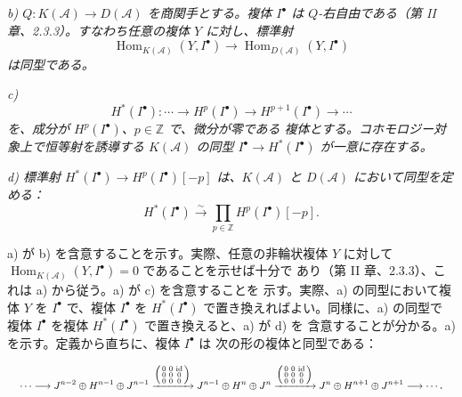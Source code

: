 \clearpage
{}%
\begingroup\small\setlength{\parskip}{0pt}\setlength{\emergencystretch}{1.5em}
\setlength{\abovedisplayskip}{4pt plus 2pt minus 2pt}%
\setlength{\belowdisplayskip}{4pt plus 2pt minus 2pt}%

\noindent\textit{b)
$Q\colon K(\mathcal A)\longrightarrow D(\mathcal A)$ を商関手とする。複体
$I^\bullet$ は $Q$-右自由である（第 II 章、2.3.3）。すなわち任意の複体
$Y$ に対し、標準射}
\[
\operatorname{Hom}_{K(\mathcal A)}(Y,I^\bullet)
\longrightarrow\operatorname{Hom}_{D(\mathcal A)}(Y,I^\bullet)
\]
\textit{は同型である。}

\noindent\textit{c)}
\[
H^*(I^\bullet)\colon\cdots\longrightarrow H^p(I^\bullet)
\longrightarrow H^{p+1}(I^\bullet)\longrightarrow\cdots
\]
\textit{を、成分が $H^p(I^\bullet)$、$p\in\mathbb Z$ で、微分が零である
複体とする。コホモロジー対象上で恒等射を誘導する $K(\mathcal A)$ の同型
$I^\bullet\longrightarrow H^*(I^\bullet)$ が一意に存在する。}

\noindent\textit{d) 標準射
$H^*(I^\bullet)\longrightarrow H^p(I^\bullet)[-p]$ は、$K(\mathcal A)$ と
$D(\mathcal A)$ において同型を定める：}
\[
H^*(I^\bullet)\xrightarrow{\sim}
\prod_{p\in\mathbb Z}H^p(I^\bullet)[-p].
\]

a) が b) を含意することを示す。実際、任意の非輪状複体 $Y$ に対して
$\operatorname{Hom}_{K(\mathcal A)}(Y,I^\bullet)=0$ であることを示せば十分で
あり（第 II 章、2.3.3）、これは a) から従う。a) が c) を含意することを
示す。実際、a) の同型において複体 $Y$ を $I^\bullet$ で、複体
$I^\bullet$ を $H^*(I^\bullet)$ で置き換えればよい。同様に、a) の同型で
複体 $I^\bullet$ を複体 $H^*(I^\bullet)$ で置き換えると、a) が d) を
含意することが分かる。a) を示す。定義から直ちに、複体 $I^\bullet$ は
次の形の複体と同型である：

\[
\resizebox{0.98\linewidth}{!}{$
\displaystyle
\cdots\longrightarrow
J^{n-2}\oplus H^{n-1}\oplus J^{n-1}
\xrightarrow{\left(\begin{smallmatrix}
0&0&\mathrm{id}\\0&0&0\\0&0&0
\end{smallmatrix}\right)}
J^{n-1}\oplus H^n\oplus J^n
\xrightarrow{\left(\begin{smallmatrix}
0&0&\mathrm{id}\\0&0&0\\0&0&0
\end{smallmatrix}\right)}
J^n\oplus H^{n+1}\oplus J^{n+1}
\longrightarrow\cdots
$}.
\]

